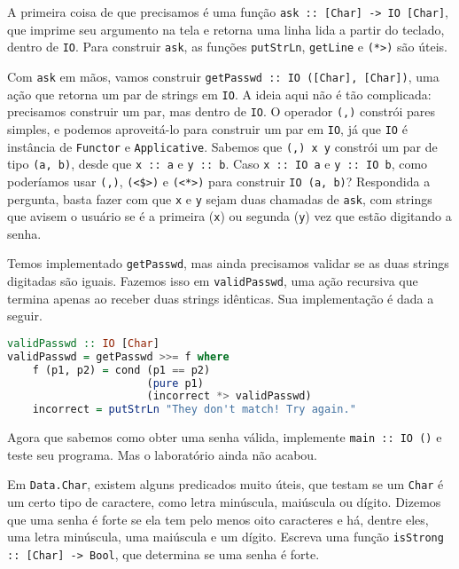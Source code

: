 \documentclass[a4paper]{article}
\begin{document}
A primeira coisa de que precisamos é uma função \texttt{ask :: [Char] -> IO [Char]}, que imprime seu argumento na tela e retorna uma linha lida a partir do teclado, dentro de \texttt{IO}.
Para construir \texttt{ask}, as funções \texttt{putStrLn}, \texttt{getLine} e \texttt{(*>)} são úteis.

Com \texttt{ask} em mãos, vamos construir \texttt{getPasswd :: IO ([Char], [Char])}, uma ação que retorna um par de strings em \texttt{IO}.
A ideia aqui não é tão complicada: precisamos construir um par, mas dentro de \texttt{IO}.
O operador \texttt{(,)} constrói pares simples, e podemos aproveitá-lo para construir um par em \texttt{IO}, já que \texttt{IO} é instância de \texttt{Functor} e \texttt{Applicative}.
Sabemos que \mbox{\texttt{(,) x y}} constrói um par de tipo \texttt{(a, b)}, desde que \texttt{x :: a} e \texttt{y :: b}.
Caso \mbox{\texttt{x :: IO a}} e \mbox{\texttt{y :: IO b}}, como poderíamos usar \texttt{(,)}, \texttt{(<\$>)} e \texttt{(<*>)} para construir \texttt{IO (a, b)}?
Respondida a pergunta, basta fazer com que \texttt{x} e \texttt{y} sejam duas chamadas de \texttt{ask}, com strings que avisem o usuário se é a primeira (\texttt{x}) ou segunda (\texttt{y}) vez que estão digitando a senha.

Temos implementado \texttt{getPasswd}, mas ainda precisamos validar se as duas strings digitadas são iguais.
Fazemos isso em \texttt{validPasswd}, uma ação recursiva que termina apenas ao receber duas strings idênticas.
Sua implementação é dada a seguir.

\pagebreak

\begin{lstlisting}[language=haskell, frame=single]
validPasswd :: IO [Char]
validPasswd = getPasswd >>= f where
    f (p1, p2) = cond (p1 == p2)
                      (pure p1)
                      (incorrect *> validPasswd)
    incorrect = putStrLn "They don't match! Try again."
\end{lstlisting}

Agora que sabemos como obter uma senha válida, implemente \texttt{main :: IO ()} e teste seu programa.
Mas o laboratório ainda não acabou.

Em \texttt{Data.Char}, existem alguns predicados muito úteis, que testam se um \texttt{Char} é um certo tipo de caractere, como letra minúscula, maiúscula ou dígito.
Dizemos que uma senha é forte se ela tem pelo menos oito caracteres e há, dentre eles, uma letra minúscula, uma maiúscula e um dígito.
Escreva uma função \texttt{isStrong :: [Char] -> Bool}, que determina se uma senha é forte.
\end{document}
